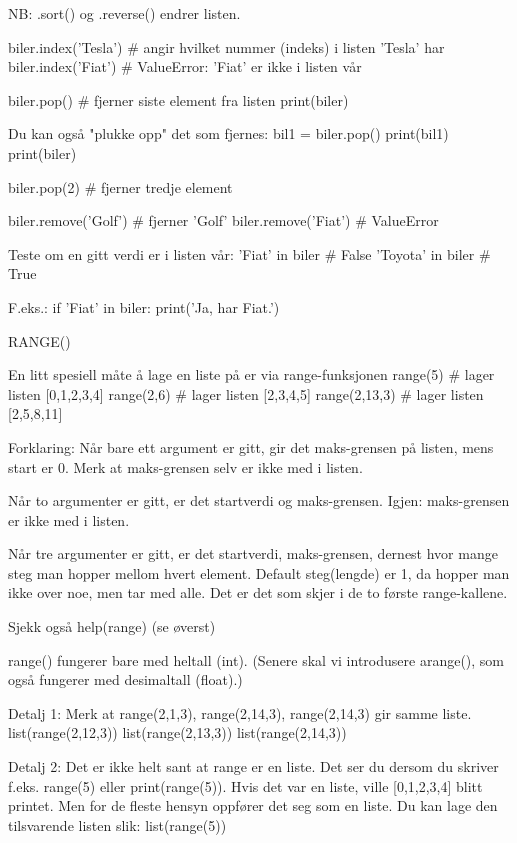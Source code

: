 {NB: .sort() og .reverse() endrer listen. 

biler.index('Tesla')  # angir hvilket nummer (indeks) i listen 'Tesla' har 
biler.index('Fiat')   # ValueError: 'Fiat' er ikke i listen vår 

biler.pop()           # fjerner siste element fra listen
print(biler)


Du kan også "plukke opp" det som fjernes:
bil1 = biler.pop()
print(bil1)
print(biler)

biler.pop(2)          # fjerner tredje element 

biler.remove('Golf')  # fjerner 'Golf'
biler.remove('Fiat')  # ValueError

Teste om en gitt verdi er i listen vår:
'Fiat' in biler       # False
'Toyota' in biler     # True

F.eks.:
if 'Fiat' in biler:
   print('Ja, har Fiat.')






RANGE()

En litt spesiell måte å lage en liste på er via range-funksjonen
range(5)        # lager listen [0,1,2,3,4]  
range(2,6)      # lager listen [2,3,4,5]
range(2,13,3)   # lager listen [2,5,8,11]

Forklaring: 
Når bare ett argument er gitt, gir det maks-grensen på listen, mens start er 0.
Merk at maks-grensen selv er ikke med i listen.

Når to argumenter er gitt, er det startverdi og maks-grensen.
Igjen: maks-grensen er ikke med i listen. 

Når tre argumenter er gitt, er det startverdi, maks-grensen, dernest hvor mange
steg man hopper mellom hvert element.
Default steg(lengde) er 1, da hopper man ikke over noe, men tar med alle.
Det er det som skjer i de to første range-kallene. 

Sjekk også 
help(range)
(se øverst) 



range() fungerer bare med heltall (int).
(Senere skal vi introdusere arange(), som også fungerer med desimaltall (float).) 


Detalj 1: Merk at range(2,1,3), range(2,14,3), range(2,14,3) gir samme liste. 
list(range(2,12,3))
list(range(2,13,3))
list(range(2,14,3))


Detalj 2: Det er ikke helt sant at range er en liste.
Det ser du dersom du skriver f.eks. range(5) eller print(range(5)).
Hvis det var en liste, ville [0,1,2,3,4] blitt printet. 
Men for de fleste hensyn oppfører det seg som en liste. 
Du kan lage den tilsvarende listen slik:
list(range(5))


}

